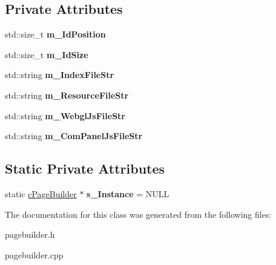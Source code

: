 \subsection*{\-Private \-Attributes}
\begin{DoxyCompactItemize}
\item 
\hypertarget{classhttp__server_1_1cPageBuilder_a98fc3701625a6e09deb368eca4aae6da}{
std\-::size\-\_\-t {\bfseries m\-\_\-\-Id\-Position}}
\label{classhttp__server_1_1cPageBuilder_a98fc3701625a6e09deb368eca4aae6da}

\item 
\hypertarget{classhttp__server_1_1cPageBuilder_a2a5da5d3ab0f9f61046e2111ea36b039}{
std\-::size\-\_\-t {\bfseries m\-\_\-\-Id\-Size}}
\label{classhttp__server_1_1cPageBuilder_a2a5da5d3ab0f9f61046e2111ea36b039}

\item 
\hypertarget{classhttp__server_1_1cPageBuilder_a2c4b56ac0d42ba3d9d20945839082ef5}{
std\-::string {\bfseries m\-\_\-\-Index\-File\-Str}}
\label{classhttp__server_1_1cPageBuilder_a2c4b56ac0d42ba3d9d20945839082ef5}

\item 
\hypertarget{classhttp__server_1_1cPageBuilder_adc3bb5aec5159c7556a6012562faf9f0}{
std\-::string {\bfseries m\-\_\-\-Resource\-File\-Str}}
\label{classhttp__server_1_1cPageBuilder_adc3bb5aec5159c7556a6012562faf9f0}

\item 
\hypertarget{classhttp__server_1_1cPageBuilder_ab042991bd624949e0a45d62e975dacdd}{
std\-::string {\bfseries m\-\_\-\-Webgl\-Js\-File\-Str}}
\label{classhttp__server_1_1cPageBuilder_ab042991bd624949e0a45d62e975dacdd}

\item 
\hypertarget{classhttp__server_1_1cPageBuilder_acff93f71f4bbc839dba06b1732ea3fa2}{
std\-::string {\bfseries m\-\_\-\-Com\-Panel\-Js\-File\-Str}}
\label{classhttp__server_1_1cPageBuilder_acff93f71f4bbc839dba06b1732ea3fa2}

\end{DoxyCompactItemize}
\subsection*{\-Static \-Private \-Attributes}
\begin{DoxyCompactItemize}
\item 
\hypertarget{classhttp__server_1_1cPageBuilder_a5857987a8133c3768bac833850d12613}{
static \hyperlink{classhttp__server_1_1cPageBuilder}{c\-Page\-Builder} $\ast$ {\bfseries s\-\_\-\-Instance} = \-N\-U\-L\-L}
\label{classhttp__server_1_1cPageBuilder_a5857987a8133c3768bac833850d12613}

\end{DoxyCompactItemize}


\-The documentation for this class was generated from the following files\-:\begin{DoxyCompactItemize}
\item 
pagebuilder.\-h\item 
pagebuilder.\-cpp\end{DoxyCompactItemize}
